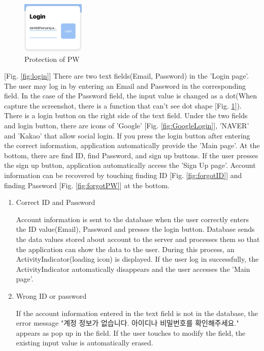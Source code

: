 \documentclass[conference]{IEEEtran}
\begin{document}
\begin{itemize}
\par \begin{figure}[h!]
\includegraphics[width=3cm]{image/PW.jpg}
\centering
\caption{Protection of PW}
\label{fig:Protection of PW}
\end{figure}

[Fig. \ref{fig:login}] There are two text fields(Email, Password) in the 'Login page'. The user may log in by entering an Email and Password in the corresponding field. In the case of the Password field, the input value is changed as a dot(When capture the screenshot, there is a function that can't see dot shape [Fig. \ref{fig:Protection of PW}]). There is a login button on the right side of the text field. Under the two fields and login button, there are icons of 'Google' [Fig. \ref{fig:GoogleLogin}], 'NAVER' and 'Kakao' that allow social login. If you press the login button after entering the correct information, application automatically provide the 'Main page'. At the bottom, there are find ID, find Password, and sign up buttons. If the user presses the sign up button, application automatically access the 'Sign Up page'. Account information can be recovered by touching finding ID [Fig. \ref{fig:forgotID}] and finding Password [Fig. \ref{fig:forgotPW}] at the bottom.

\begin{enumerate}
\setlength{\parindent}{2ex}
\item Correct ID and Password

Account information is sent to the database when the user correctly enters the ID value(Email), Password and presses the login button. Database sends the data values stored about account to the server and processes them so that the application can show the data to the user. During this process, an ActivityIndicator(loading icon) is displayed. If the user log in successfully, the ActivityIndicator automatically disappears and the user accesses the 'Main page'.

\item Wrong ID or password

If the account information entered in the text field is not in the database, the error message "계정 정보가 없습니다. 아이디나 비밀번호를 확인해주세요." appears as pop up in the field. If the user touches to modify the field, the existing input value is automatically erased.


\end{enumerate}
\end{itemize}
\end{document}
